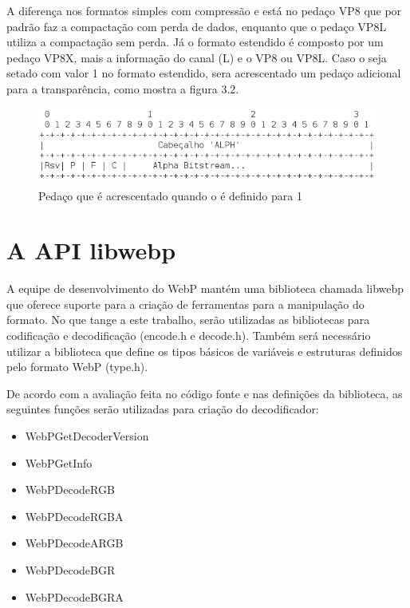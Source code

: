 \documentclass[espaco=simples,appendix=Name]{abnt}
\begin{document}
A diferença nos formatos simples com compressão  e  está no pedaço VP8 que por padrão faz a compactação com perda de dados, enquanto que o pedaço VP8L utiliza a compactação sem perda. Já o formato estendido é composto por um pedaço VP8X, mais a informação do canal  (L) e o  VP8 ou VP8L. Caso o  seja setado com valor 1 no formato estendido, sera acrescentado um pedaço adicional para a transparência, como mostra a figura 3.2.

\begin{figure}[h]
  \centering
    \includegraphics[scale=0.4]{AlphaChunk.png}
  \caption{Pedaço que é acrescentado quando o  é definido para 1}
\end{figure}

\section{A API libwebp}

A equipe de desenvolvimento do WebP mantém uma biblioteca chamada libwebp que oferece suporte para a criação de ferramentas para a manipulação do formato. No que tange a este trabalho, serão utilizadas as bibliotecas para codificação e decodificação (encode.h e decode.h). Também será necessário utilizar a biblioteca que define os tipos básicos de variáveis e estruturas definidos pelo formato WebP (type.h).

De acordo com a avaliação feita no código fonte e nas definições da biblioteca, as seguintes funções serão utilizadas para criação do decodificador:

\begin{itemize}
	\item WebPGetDecoderVersion
	\item WebPGetInfo
	\item WebPDecodeRGB
	\item WebPDecodeRGBA
	\item WebPDecodeARGB
	\item WebPDecodeBGR
	\item WebPDecodeBGRA
\end{itemize}
\end{document}
